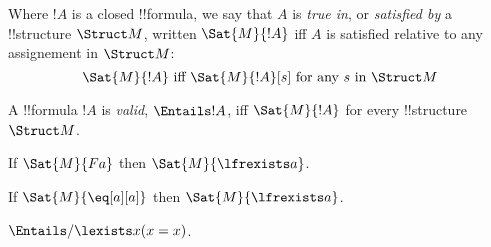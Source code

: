 \documentclass[../../../include/open-logic-section]{subfiles}
\begin{document}
\begin{defn}[Truth]
Where $!A$ is a closed !!{formula}, we say that $A$ is \emph{true in}, or
\emph{satisfied by} a !!{structure} $\Struct M$, written $\Sat{M}{!A}$ iff 
$A$ is satisfied relative to any assignement in $\Struct M$:
$$\Sat{M}{!A}\textrm{ iff }\Sat{M}{!A}[s]\textrm{ for any }s\textrm{ in }\Struct M$$
\end{defn}

\begin{defn}[Validity]
A !!{formula} $!A$ is \emph{valid}, $\Entails !A$, iff $\Sat{M}{!A}$ for every
!!{structure}~$\Struct M$.
\end{defn}

\begin{ex}
If $\Sat{M}{Fa}$ then $\Sat{M}{\lfrexists a}$.
\end{ex}

\begin{ex}
If $\Sat{M}{\eq[a][a]}$ then $\Sat{M}{\lfrexists a}$.
\end{ex}

\begin{ex}
$\Entails/ \lexists x (x = x)$.
\end{ex}
\end{document}
